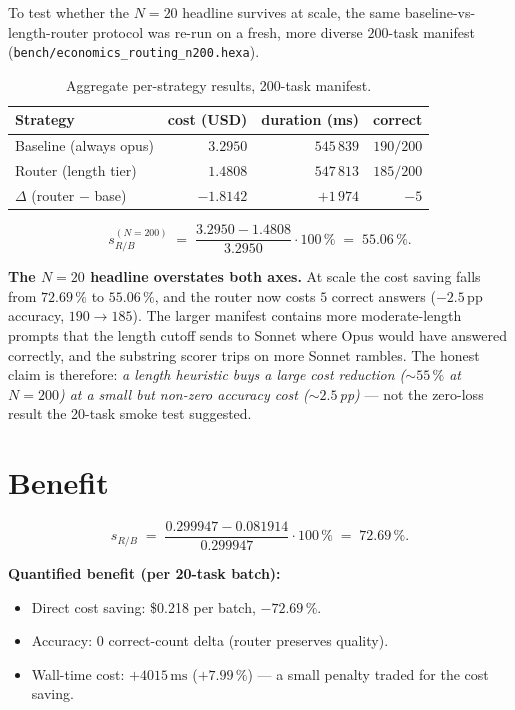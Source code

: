 \documentclass[11pt,a4paper]{article}
\begin{document}
To test whether the $N = 20$ headline survives at scale, the same
baseline-vs-length-router protocol was re-run on a fresh, more diverse
$200$-task manifest (\texttt{bench/economics\_routing\_n200.hexa}).

\begin{table}[h]
\centering
\caption{Aggregate per-strategy results, 200-task manifest.}
\label{tab:results-n200}
\begin{tabular}{lrrr}
\toprule
\textbf{Strategy} & \textbf{cost (USD)} & \textbf{duration (ms)} &
\textbf{correct} \\
\midrule
Baseline (always opus) & $3.2950$ & $545\,839$ & $190/200$ \\
Router (length tier)    & $1.4808$ & $547\,813$ & $185/200$ \\
\midrule
$\Delta$ (router $-$ base) & $-1.8142$ & $+1\,974$ & $-5$ \\
\bottomrule
\end{tabular}
\end{table}

\begin{equation}
  s_{R/B}^{(N=200)} \;=\; \frac{3.2950 - 1.4808}{3.2950} \cdot 100\,\%
  \;=\; \mathbf{55.06\,\%}.
\end{equation}

\textbf{The $N = 20$ headline overstates both axes.} At scale the cost
saving falls from $72.69\,\%$ to $55.06\,\%$, and the router now costs
$5$ correct answers ($-2.5\,$pp accuracy, $190 \to 185$). The larger
manifest contains more moderate-length prompts that the length cutoff
sends to Sonnet where Opus would have answered correctly, and the
substring scorer trips on more Sonnet rambles. The honest claim is
therefore: \emph{a length heuristic buys a large cost reduction
($\sim 55\,\%$ at $N=200$) at a small but non-zero accuracy cost
($\sim 2.5\,$pp)} --- not the zero-loss result the 20-task smoke test
suggested.

\section{Benefit}
\label{sec:benefit}

\begin{equation}
  s_{R/B} \;=\; \frac{0.299947 - 0.081914}{0.299947} \cdot 100\,\%
  \;=\; \mathbf{72.69\,\%}.
\end{equation}

\textbf{Quantified benefit (per 20-task batch):}
\begin{itemize}\itemsep0pt
\item Direct cost saving: \$0.218 per batch, $-72.69\,\%$.
\item Accuracy: $0$ correct-count delta (router preserves quality).
\item Wall-time cost: $+4015\,\text{ms}$ ($+7.99\,\%$) --- a small
      penalty traded for the cost saving.
\end{itemize}
\end{document}
